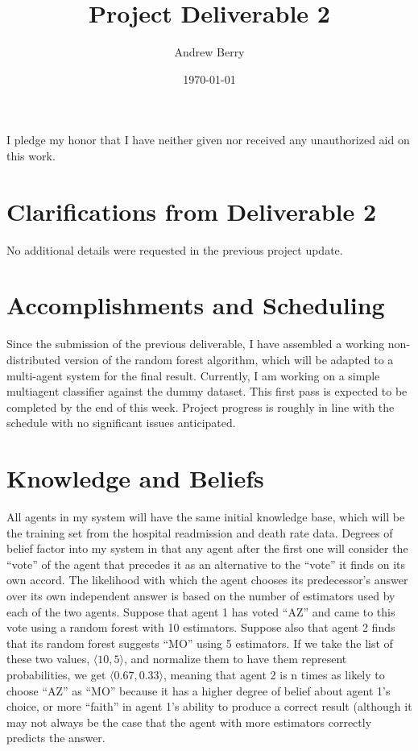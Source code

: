 \documentclass{article}
\title{Project Deliverable 2}
\author{Andrew Berry}
\date{\today}
\begin{document}
\maketitle

I pledge my honor that I have neither given nor received any unauthorized aid on this work.
\section{Clarifications from Deliverable 2}
No additional details were requested in the previous project update.
\section{Accomplishments and Scheduling}
Since the submission of the previous deliverable, I have assembled a working non-distributed version of the random forest algorithm, which will be adapted to a multi-agent system for the final result. Currently, I am working on a simple multiagent classifier against the dummy dataset. This first pass is expected to be completed by the end of this week. Project progress is roughly in line with the schedule with no significant issues anticipated.
\section{Knowledge and Beliefs}
All agents in my system will have the same initial knowledge base, which will be the training set from the hospital readmission and death rate data. Degrees of belief factor into my system in that any agent after the first one will consider the ``vote'' of the agent that precedes it as an alternative to the ``vote'' it finds on its own accord. The likelihood with which the agent chooses its predecessor's answer over its own independent answer is based on the number of estimators used by each of the two agents. Suppose that agent 1 has voted ``AZ'' and came to this vote using a random forest with 10 estimators. Suppose also that agent 2 finds that its random forest suggests ``MO'' using 5 estimators. If we take the list of these two values, $ \langle 10, 5 \rangle $, and normalize them to have them represent probabilities, we get $ \langle 0.67, 0.33 \rangle $, meaning that agent 2 is n times as likely to choose ``AZ'' as ``MO'' because it has a higher degree of belief about agent 1's choice, or more ``faith'' in agent 1's ability to produce a correct result (although it may not always be the case that the agent with more estimators correctly predicts the answer.
\end{document}
